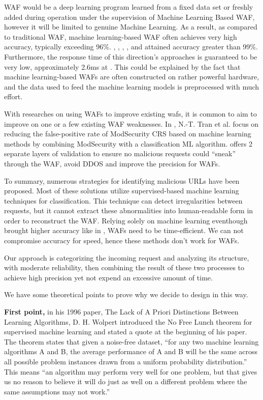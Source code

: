 WAF would be a deep learning program learned from a fixed data set or freshly added during operation under the supervision of Machine Learning Based WAF, however it will be limited to genuine Machine Learning. As a result, as compared to traditional WAF, machine learning-based WAF often achieves very high accuracy, typically exceeding 96\%. \cite{Jemal}, \cite{Toprak}, \cite{Gogoi}, \cite{Devi}, and \cite{Alshammari} attained accuracy greater than 99\%. Furthermore, the response time of this direction's approaches is guaranteed to be very low, approximately 2.6ms at \cite{Jemal}. This could be explained by the fact that machine learning-based WAFs are often constructed on rather powerful hardware, and the data used to feed the machine learning models is preprocessed with much effort.

With researches on using WAFs to improve existing wafs, it is common to aim to improve on one or a few existing WAF weaknesses. In \cite{Tin}, N.-T. Tran et al. focus on reducing the false-positive rate of ModSecurity CRS based on machine learning methods by combining ModSecurity with a classification ML algorithm. \cite{Dawadi} offers 2 separate layers of validation to ensure no malicious requests could “sneak” through the WAF, avoid DDOS and improve the precision for WAFs.
 
To summary, numerous strategies for identifying malicious URLs have been proposed. Most of these solutions utilize supervised-based machine learning techniques for classification. This technique can detect irregularities between requests, but it cannot extract these abnormalities into human-readable form in order to reconstruct the WAF. Relying solely on machine learning eventhough brought higher accuracy like in \cite{s22093373}, WAFs need to be time-efficient. We can not compromise accuracy for speed, hence these methods don't work for WAFs.

Our approach is categorizing the incoming request and analyzing its structure, with moderate reliability, then combining the result of these two processes to achieve high precision yet not expend an excessive amount of time.

We have some theoretical points to prove why we decide to design in this way.

\textbf{First point,} in his 1996 paper, The Lack of A Priori Distinctions Between Learning Algorithms, D. H. Wolpert introduced the No Free Lunch theorem for supervised machine learning and stated a quote at the beginning of his paper. The theorem states that given a noise-free dataset, “for any two machine learning algorithms A and B, the average performance of A and B will be the same across all possible problem instances drawn from a uniform probability distribution.” This means  “an algorithm may perform very well for one problem, but that gives us no reason to believe it will do just as well on a different problem where the same assumptions may not work.”

